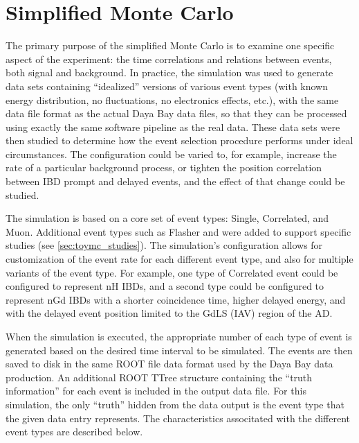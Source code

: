 \section{Simplified Monte Carlo}
\label{sec:toymc}

The primary purpose of the simplified Monte Carlo
is to examine one specific aspect of the experiment:
the time correlations and relations between events, both signal and background.
In practice, the simulation was used to generate data sets
containing ``idealized'' versions of various event types
(with known energy distribution, no fluctuations, no electronics effects, etc.),
with the same data file format as the actual Daya Bay data files,
so that they can be processed using exactly the same software pipeline
as the real data.
These data sets were then studied to determine how the event selection procedure
performs under ideal circumstances.
The configuration could be varied to, for example,
increase the rate of a particular background process,
or tighten the position correlation between IBD prompt and delayed events,
and the effect of that change could be studied.

The simulation is based on a core set of event types:
Single, Correlated, and Muon.
Additional event types such as Flasher and \li{} were added to support specific studies
(see \cref{sec:toymc_studies}).
The simulation's configuration allows for customization of the event rate
for each different event type,
and also for multiple variants of the event type.
For example, one type of Correlated event could be configured to represent nH IBDs,
and a second type could be configured to represent nGd IBDs
with a shorter coincidence time, higher delayed energy,
and with the delayed event position limited to the GdLS (IAV) region of the AD.

When the simulation is executed,
the appropriate number of each type of event is generated
based on the desired time interval to be simulated.
The events are then saved to disk in the same ROOT file data format
used by the Daya Bay data production.
An additional ROOT TTree structure containing the ``truth information''
for each event is included in the output data file.
For this simulation, the only ``truth'' hidden from the data output
is the event type that the given data entry represents.
The characteristics associtated with the different event types
are described below.

